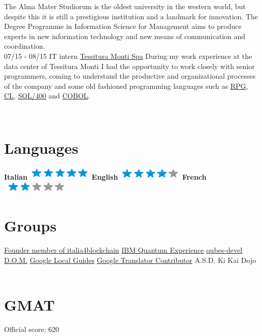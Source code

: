 \documentclass[]{friggeri-cv}
\begin{document}
\begin{entrylist}
    {The Alma Mater Studiorum is the oldest university in the western world, but despite this it is still a prestigious institution and a landmark for innovation. The Degree Programme in Information Science for Management aims to produce experts in new information technology and new means of communication and coordination. \\}
    \entry
    {07/15 - 08/15}
    {IT intern}
    {\href{http://www.monti.it/en_eu/}{Tessitura Monti Spa}}
    {During my work experience at the data center of Tessitura Monti I had the opportunity to work closely with senior programmers, coming to understand the productive and organizational processes of the company and some old fashioned programming languages such as \href{https://goo.gl/R4Tezc}{RPG}, \href{https://goo.gl/RsCpyU}{CL}, \href{https://goo.gl/T9cKu4}{SQL/400} and \href{https://goo.gl/Xs0BJz}{COBOL}.\\}
    
    \end{entrylist}
    
    \newpage
    
    



\begin{aside}
~
~
~
  \section{Languages}
    \textbf{Italian}\includegraphics[scale=0.40]{img/5stars.png}
    \textbf{English}\includegraphics[scale=0.40]{img/4stars.png}
    \textbf{French}\includegraphics[scale=0.40]{img/2stars.png}
    ~
    \section{Groups}
    \href{https://www.italia4blockchain.it/}{Founder member of italia4blockchain}
    \href{https://quantumexperience.ng.bluemix.net/qstage/#/community}{IBM Quantum Experience}
    \href{https://groups.google.com/forum/#!forum/qubes-devel}{qubes-devel}
    \href{http://www.liceodavinci.tv/sitoLiceo/index.php/offerta-formativa/progetti/126-gruppo-di-informatica-d-o-m}{D.O.M.}
    \href{https://www.google.com/maps/contrib/100973650799154081103/reviews}{Google Local Guides} 
    \href{https://translate.google.com/community}{Google Translator Contributor}
    {A.S.D. Ki Kai Dojo}
    ~
    \section{GMAT}
    {Official score: 620}
    ~
\end{aside}
\end{document}
